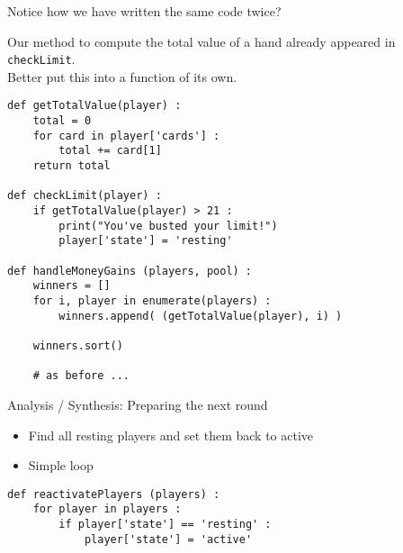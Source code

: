 
\begin{frame}
%
\begin{warnbox}
Notice how we have written the same code twice?

Our method to compute the total value of a hand already appeared in \texttt{checkLimit}.\\
Better put this into a function of its own.
\end{warnbox}
%
\end{frame}


\begin{frame}[fragile]
%
\begin{codebox}
\begin{verbatim}
def getTotalValue(player) :
    total = 0
    for card in player['cards'] :
        total += card[1]
    return total

def checkLimit(player) :
    if getTotalValue(player) > 21 :
        print("You've busted your limit!")
        player['state'] = 'resting'

def handleMoneyGains (players, pool) :
    winners = []
    for i, player in enumerate(players) :
        winners.append( (getTotalValue(player), i) )
    
    winners.sort()
    
    # as before ...
\end{verbatim}
\end{codebox}
%
\end{frame}


\begin{frame}[fragile]{Analysis / Synthesis: Preparing the next round}
%
\begin{itemize}
\item Find all resting players and set them back to active
\item Simple  loop
\end{itemize}
%
\begin{codebox}
\begin{verbatim}
def reactivatePlayers (players) :
    for player in players :
        if player['state'] == 'resting' :
            player['state'] = 'active'
\end{verbatim}
\end{codebox}
%
\end{frame}

